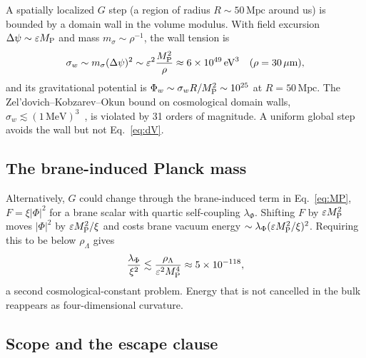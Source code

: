 \documentclass[aps,prd,reprint,superscriptaddress,nofootinbib,floatfix]{revtex4-2}
\theoremstyle{definition}
\newcommand{\MP}{M_{\rm P}}
\newcommand{\Mpc}{\,\mathrm{Mpc}}
\newcommand{\eV}{\,\mathrm{eV}}
\newcommand{\um}{\,\mu\mathrm{m}}
\begin{document}
A spatially localized $G$ step (a region of radius $R\sim 50\Mpc$ around us) is bounded by a domain wall in the volume modulus. With field excursion $\Delta\psi\sim\varepsilon\MP$ and mass $m_\sigma\sim\rho^{-1}$, the wall tension is
\begin{equation}
\sigma_w \sim m_\sigma(\Delta\psi)^2 \sim \varepsilon^2\frac{\MP^2}{\rho} \approx 6\times10^{49}\eV^3 \quad(\rho=30\um),
\end{equation}
and its gravitational potential is $\Phi_w\sim\sigma_wR/\MP^2\sim10^{25}$ at $R=50\Mpc$. The Zel'dovich--Kobzarev--Okun bound on cosmological domain walls, $\sigma_w\lesssim(1\,\mathrm{MeV})^3$~\cite{ZKO1974}, is violated by 31 orders of magnitude. A uniform global step avoids the wall but not Eq.~\eqref{eq:dV}.

\subsection{The brane-induced Planck mass}\label{sec:induced}

Alternatively, $G$ could change through the brane-induced term in Eq.~\eqref{eq:MP}, $F=\xi|\Phi|^2$ for a brane scalar with quartic self-coupling $\lambda_\Phi$. Shifting $F$ by $\varepsilon\MP^2$ moves $|\Phi|^2$ by $\varepsilon\MP^2/\xi$ and costs brane vacuum energy $\sim\lambda_\Phi(\varepsilon\MP^2/\xi)^2$. Requiring this to be below $\rho_\Lambda$ gives
\begin{equation}
\frac{\lambda_\Phi}{\xi^2}\lesssim\frac{\rho_\Lambda}{\varepsilon^2\MP^4}\approx 5\times10^{-118},
\end{equation}
a second cosmological-constant problem. Energy that is not cancelled in the bulk reappears as four-dimensional curvature.

\subsection{Scope and the escape clause}
\end{document}
